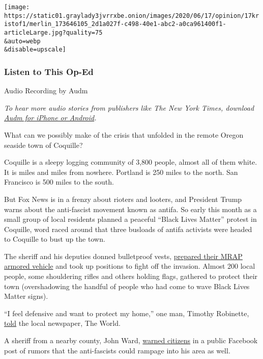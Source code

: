 \texttt{[image: https://static01.graylady3jvrrxbe.onion/images/2020/06/17/opinion/17kristof1/merlin\_173646105\_2d1a027f-c498-40e1-abc2-a0ca961400f1-articleLarge.jpg?quality=75\\\&auto=webp\\\&disable=upscale]}

\hypertarget{listen-to-this-op-ed}{%
\subsubsection{Listen to This Op-Ed}\label{listen-to-this-op-ed}}

Audio Recording by Audm

\emph{To hear more audio stories from publishers like The New York
Times, download}
\href{https://www.audm.com/?utm_source=nytopinion\&utm_medium=embed\&utm_campaign=antifa_hysteria_america}{\emph{Audm
for iPhone or Android}}\emph{.}

What can we possibly make of the crisis that unfolded in the remote
Oregon seaside town of Coquille?

Coquille is a sleepy logging community of 3,800 people, almost all of
them white. It is miles and miles from nowhere. Portland is 250 miles to
the north. San Francisco is 500 miles to the south.

But Fox News is in a frenzy about rioters and looters, and President
Trump warns about the anti-fascist movement known as antifa. So early
this month as a small group of local residents planned a peaceful
``Black Lives Matter'' protest in Coquille, word raced around that three
busloads of antifa activists were headed to Coquille to bust up the
town.

The sheriff and his deputies donned bulletproof vests,
\href{https://theworldlink.com/news/local/photo-gallery-hundreds-turn-out-over-rumored-riot/collection_71a9dfac-a562-11ea-b81d-1f2184b2b90b.html\#11}{prepared
their MRAP armored vehicle} and took up positions to fight off the
invasion. Almost 200 local people, some shouldering rifles and others
holding flags, gathered to protect their town (overshadowing the handful
of people who had come to wave Black Lives Matter signs).

``I feel defensive and want to protect my home,'' one man, Timothy
Robinette,
\href{https://theworldlink.com/news/local/hundreds-turn-out-to-stop-rumored-riot/article_b58d6386-a59b-11ea-90f0-7f3504c58c5d.html}{told}
the local newspaper, The World.

A sheriff from a nearby county, John Ward,
\href{https://ktvl.com/news/local/not-a-call-to-arms-curry-county-sheriff-explains-facebook-post-on-rumored-antifa-bus}{warned
citizens} in a public Facebook post of rumors that the anti-fascists
could rampage into his area as well.

